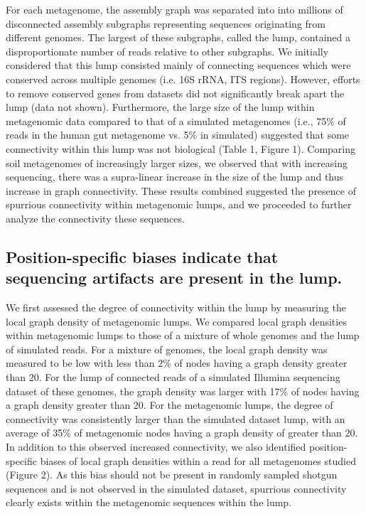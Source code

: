 \documentclass[11pt]{article} %
\begin{document}
For each metagenome, the assembly graph was separated into into millions of disconnected assembly subgraphs representing sequences originating from different genomes.  The largest of these subgraphs, called the lump, contained a disproportionate number of reads relative to other subgraphs.  We initially considered that this lump consisted mainly of connecting sequences which were conserved across multiple genomes (i.e. 16S rRNA, ITS regions).  However, efforts to remove conserved genes from datasets did not significantly break apart the lump (data not shown).  Furthermore, the large size of the lump within metagenomic data compared to that of a simulated metagenomes (i.e., 75\% of reads in the human gut metagenome vs. 5\% in simulated) suggested that some connectivity within this lump was not biological (Table 1, Figure 1).  Comparing soil metagenomes of increasingly larger sizes, we observed that with increasing sequencing, there was a supra-linear increase in the size of the lump and thus increase in graph connectivity. These results combined suggested the presence of spurrious connectivity within metagenomic lumps, and we proceeded to further analyze the connectivity these sequences.

\subsection{Position-specific biases indicate that sequencing artifacts are present in the lump.}
We first assessed the degree of connectivity within the lump by measuring the local graph density of metagenomic lumps.  We compared local graph densities within metagenomic lumps to those of a mixture of whole genomes and the lump of simulated reads.  For a mixture of genomes, the local graph density was measured to be low with less than 2\% of nodes having a graph density greater than 20.  For the lump of connected reads of a simulated Illumina sequencing dataset of these genomes, the graph density was larger with 17\% of nodes having a graph density greater than 20.   For the metagenomic lumps, the degree of connectivity was consistently larger than the simulated dataset lump, with an average of 35\% of metagenomic nodes having a graph density of greater than 20.   In addition to this observed increased connectivity, we also identified position-specific biases of local graph densities within a read for all metagenomes studied (Figure 2).  As this bias should not be present in randomly sampled shotgun sequences and is not observed in the simulated dataset, spurrious connectivity clearly exists within the metagenomic sequences within the lump.  
\end{document}
